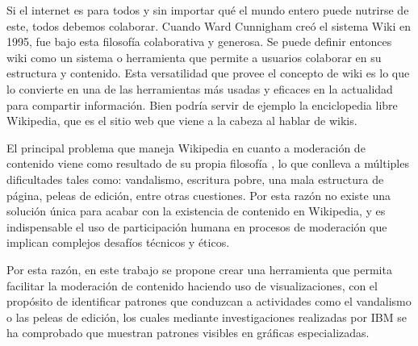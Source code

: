 

Si el internet es para todos y sin importar qué el mundo entero puede nutrirse de este, todos debemos colaborar. Cuando Ward Cunnigham creó el sistema Wiki en 1995, fue bajo esta filosofía colaborativa y generosa. Se puede definir entonces wiki como un sistema o herramienta que permite a usuarios colaborar en su estructura y contenido. Esta versatilidad que provee el concepto de wiki es lo que lo convierte en una de las herramientas más usadas y eficaces en la actualidad para compartir información. Bien podría servir de ejemplo la enciclopedia libre Wikipedia, que es el sitio web que viene a la cabeza al hablar de wikis.

El principal problema que maneja Wikipedia en cuanto a moderación de contenido viene como resultado de su propia filosofía , lo que conlleva a múltiples dificultades tales como: vandalismo, escritura pobre, una mala estructura de página, peleas de edición, entre otras cuestiones. Por esta razón no existe una solución única para acabar con la existencia de  contenido en Wikipedia, y es indispensable el uso de participación humana en procesos de moderación que implican complejos desafíos técnicos y éticos.

Por esta razón, en este trabajo se propone crear una herramienta que permita facilitar la moderación de contenido haciendo uso de visualizaciones, con el propósito de identificar patrones que conduzcan a actividades como el vandalismo o las peleas de edición, los cuales mediante investigaciones realizadas por IBM\cite{HistoryFlowVisualizations} se ha comprobado que muestran patrones visibles en gráficas especializadas.

\iffalse
Gracias a la evolución del internet en la actualidad se considera que la información es virtualmente ubicua y está en constante cambio, entonces lo que realmente ofrece valor es la capacidad individual de sintetizar esa información y relacionarla.

El concepto de la filosofía de wiki y el software utilizado para crear estos sitios web están intrínsecamente relacionados y no se podría poner en práctica lo primero sin lo segundo. Esto es así debido a que el software debe proporcionar el medio para que pueda existir esa construcción colectiva de conocimiento, que es indispensable en la filosofía wiki.
\fi




